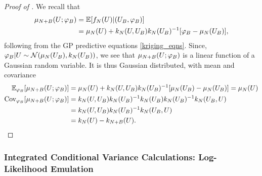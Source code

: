 \documentclass[12pt]{article}
\begin{document}
\begin{proof} [Proof of ]
We recall that 
\begin{align*}
\gpMean[\Naugment](\parMat; \designBatchFunc) 
&= \E[\funcEm[\Ndesign](\parMat) | (\designBatchIn, \designBatchFunc)] \\
&= \gpMean[\Ndesign](\parMat) + \gpKer[\Ndesign](\parMat, \designBatchIn) \gpKer[\Ndesign](\designBatchIn)^{-1} [\designBatchFunc - \gpMean[\Ndesign](\designBatchIn)],
\end{align*}
following from the GP predictive equations \ref{kriging_eqns}. Since, $\designBatchFunc|\parMat \sim \Gaussian(\gpMean[\Ndesign](\designBatchIn), \gpKer[\Ndesign](\designBatchIn))$, 
we see that $\gpMean[\Naugment](\parMat; \designBatchFunc)$ is a linear function of a Gaussian random variable. It is thus Gaussian distributed, with mean and covariance
\begin{align*}
\E_{\designBatchFunc}[\gpMean[\Naugment](\parMat; \designBatchFunc)]
&= \gpMean[\Ndesign](\parMat) + \gpKer[\Ndesign](\parMat, \designBatchIn) \gpKer[\Ndesign](\designBatchIn)^{-1} [\gpMean[\Ndesign](\designBatchIn) - \gpMean[\Ndesign](\designBatchIn)] = \gpMean[\Ndesign](\parMat) \\
\Cov_{\designBatchFunc}[\gpMean[\Naugment](\parMat; \designBatchFunc)]
&= \gpKer[\Ndesign](\parMat, \designBatchIn) \gpKer[\Ndesign](\designBatchIn)^{-1}  \gpKer[\Ndesign](\designBatchIn) \gpKer[\Ndesign](\designBatchIn)^{-1} \gpKer[\Ndesign](\designBatchIn, \parMat) \\
&=  \gpKer[\Ndesign](\parMat, \designBatchIn) \gpKer[\Ndesign](\designBatchIn)^{-1} \gpKer[\Ndesign](\designBatchIn, \parMat) \\
&= \gpKer[\Ndesign](\parMat) - \gpKer[\Naugment](\parMat).
\end{align*}
\end{proof}

\subsubsection{Integrated Conditional Variance Calculations: Log-Likelihood Emulation}
\end{document}
